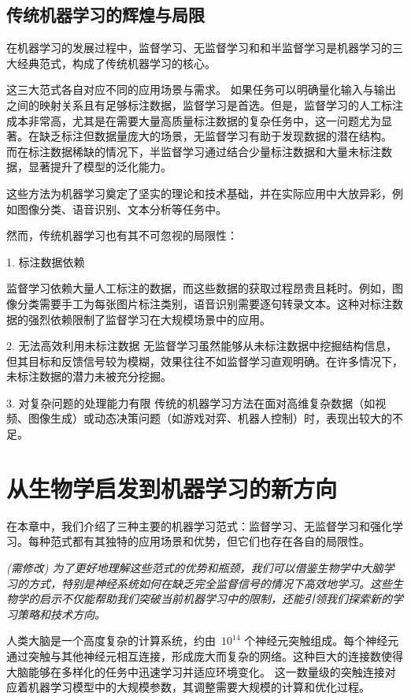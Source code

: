 {\subsection{传统机器学习的辉煌与局限}
在机器学习的发展过程中，监督学习、无监督学习和和半监督学习是机器学习的三大经典范式，构成了传统机器学习的核心。

这三大范式各自对应不同的应用场景与需求。
如果任务可以明确量化输入与输出之间的映射关系且有足够标注数据，监督学习是首选。但是，监督学习的人工标注成本非常高，尤其是在需要大量高质量标注数据的复杂任务中，这一问题尤为显著。在缺乏标注但数据量庞大的场景，无监督学习有助于发现数据的潜在结构。
而在标注数据稀缺的情况下，半监督学习通过结合少量标注数据和大量未标注数据，显著提升了模型的泛化能力。

这些方法为机器学习奠定了坚实的理论和技术基础，并在实际应用中大放异彩，例如图像分类、语音识别、文本分析等任务中。

然而，传统机器学习也有其不可忽视的局限性：

1. 标注数据依赖

监督学习依赖大量人工标注的数据，而这些数据的获取过程昂贵且耗时。例如，图像分类需要手工为每张图片标注类别，语音识别需要逐句转录文本。这种对标注数据的强烈依赖限制了监督学习在大规模场景中的应用。

2. 无法高效利用未标注数据
无监督学习虽然能够从未标注数据中挖掘结构信息，但其目标和反馈信号较为模糊，效果往往不如监督学习直观明确。在许多情况下，未标注数据的潜力未被充分挖掘。

3. 对复杂问题的处理能力有限
传统的机器学习方法在面对高维复杂数据（如视频、图像生成）或动态决策问题（如游戏对弈、机器人控制）时，表现出较大的不足。

\section{从生物学启发到机器学习的新方向}
在本章中，我们介绍了三种主要的机器学习范式：监督学习、无监督学习和强化学习。每种范式都有其独特的应用场景和优势，但它们也存在各自的局限性。

{\em (需修改) 为了更好地理解这些范式的优势和瓶颈，我们可以借鉴生物学中大脑学习的方式，特别是神经系统如何在缺乏完全监督信号的情况下高效地学习。这些生物学的启示不仅能帮助我们突破当前机器学习中的限制，还能引领我们探索新的学习策略和技术方向。

人类大脑是一个高度复杂的计算系统，约由~${10}^{14}$  个神经元突触组成。每个神经元通过突触与其他神经元相互连接，形成庞大而复杂的网络。这种巨大的连接数使得大脑能够在多样化的任务中迅速学习并适应环境变化。
这一数量级的突触连接对应着机器学习模型中的大规模参数，其调整需要大规模的计算和优化过程。

}}
